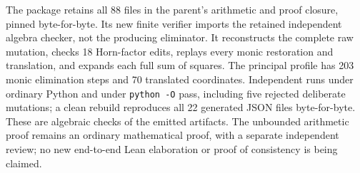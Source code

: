 The package retains all 88 files in the parent's arithmetic and proof
closure, pinned byte-for-byte.  Its new finite verifier imports the
retained independent algebra checker, not the producing eliminator.  It
reconstructs the complete raw mutation, checks 18 Horn-factor edits,
replays every monic restoration and translation, and expands each full
sum of squares.  The principal profile has 203 monic elimination steps
and 70 translated coordinates.  Independent runs under ordinary Python
and under \texttt{python -O} pass, including five rejected deliberate
mutations; a clean rebuild reproduces all 22 generated JSON files
byte-for-byte.  These are algebraic checks of the emitted artifacts.
The unbounded arithmetic proof remains an ordinary mathematical proof,
with a separate independent review; no new end-to-end Lean elaboration
or proof of consistency is being claimed.
